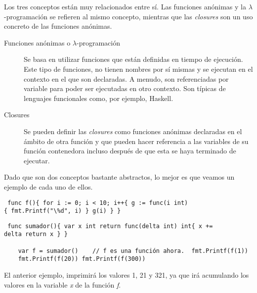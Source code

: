 Los tres conceptos están muy relacionados entre sí. Las funciones anónimas y la
$\lambda$-programación se refieren al mismo concepto, mientras que las
\textit{closures} son un uso concreto de las funciones anónimas.

\begin{description} \item[Funciones anónimas o $\lambda$-programación] Se basa
en utilizar funciones que están definidas en tiempo de ejecución. Este tipo de
funciones, no tienen nombres por sí mismas y se ejecutan en el contexto en el
que son declaradas. A menudo, son referenciadas por variable para poder ser
ejecutadas en otro contexto. Son típicas de lenguajes funcionales como, por
ejemplo, Haskell.  \item[Closures] Se pueden definir las \textit{closures} como
funciones anónimas declaradas en el ámbito de otra función y que pueden hacer
referencia a las variables de su función contenedora incluso después de que esta
se haya terminado de ejecutar.  \end{description}

Dado que son dos conceptos bastante abstractos, lo mejor es que veamos un
ejemplo de cada uno de ellos.

\begin{verbatim} func f(){ for i := 0; i < 10; i++{ g := func(i int)
{ fmt.Printf("\%d", i) } g(i) } } \end{verbatim}

\begin{verbatim} func sumador(){ var x int return func(delta int) int{ x +=
delta return x } }
    
	var f = sumador()    // f es una función ahora.  fmt.Printf(f(1))
	fmt.Printf(f(20)) fmt.Printf(f(300)) \end{verbatim}

El anterior ejemplo, imprimirá los valores 1, 21 y 321, ya que irá acumulando
los valores en la variable \textit{x} de la función \textit{f}.

\clearpage \thispagestyle{empty} \ \\ \newpage

